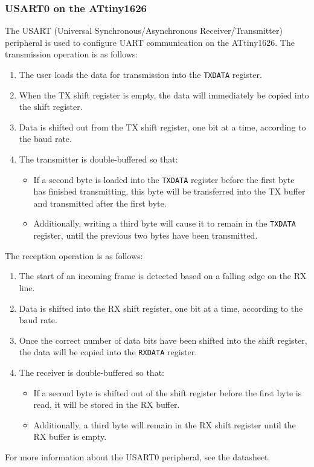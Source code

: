 \documentclass{article}
\begin{document}
\subsubsection{USART0 on the ATtiny1626}
The USART (Universal Synchronous/Asynchronous Receiver/Transmitter)
peripheral is used to configure UART communication on the ATtiny1626.
The transmission operation is as follows:
\begin{enumerate}
    \item The user loads the data for transmission into the
          \texttt{TXDATA} register.
    \item When the TX shift register is empty, the data will
          immediately be copied into the shift register.
    \item Data is shifted out from the TX shift register, one bit at a
          time, according to the baud rate.
    \item The transmitter is double-buffered so that:
          \begin{itemize}
              \item If a second byte is loaded into the
                    \texttt{TXDATA} register before the first
                    byte has finished transmitting, this byte will be
                    transferred into the TX buffer and transmitted
                    after the first byte.
              \item Additionally, writing a third byte will cause it to
                    remain in the \texttt{TXDATA} register,
                    until the previous two bytes have been transmitted.
          \end{itemize}
\end{enumerate}
The reception operation is as follows:
\begin{enumerate}
    \item The start of an incoming frame is detected based on a falling
          edge on the RX line.
    \item Data is shifted into the RX shift register, one bit at a
          time, according to the baud rate.
    \item Once the correct number of data bits have been shifted into
          the shift register, the data will be copied into the
          \texttt{RXDATA} register.
    \item The receiver is double-buffered so that:
          \begin{itemize}
              \item If a second byte is shifted out of the shift
                    register before the first byte is read, it will be
                    stored in the RX buffer.
              \item Additionally, a third byte will remain in the RX
                    shift register until the RX buffer is empty.
          \end{itemize}
\end{enumerate}
For more information about the USART0 peripheral, see the datasheet.
\end{document}
